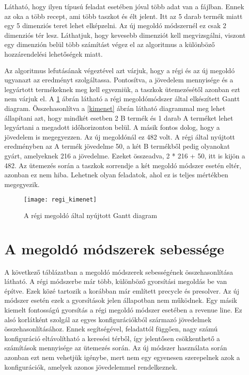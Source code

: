 Látható, hogy ilyen típusú feladat esetében jóval több adat van a fájlban.
Ennek az oka a több recept, ami több taszkot és élt jelent.
Itt az 5 darab termék miatt egy 5 dimenziós teret lehet elképzelni.
Az új megoldó módszernél ez csak 2 dimenziós tér lesz.
Láthatjuk, hogy kevesebb dimenziót kell megvizsgálni, viszont egy dimenzión belül több számítást végez el az algoritmus a különböző hozzárendelési lehetőségek miatt. 

Az algoritmus lefutásának végeztével azt várjuk, hogy a régi és az új megoldó ugyanazt az eredményt szolgáltassa.
Pontosítva, a jövedelem mennyisége és a legyártott termékeknek meg kell egyezniük, a taszkok ütemezésétől azonban ezt nem várjuk el.
A \ref{regi_kimenet} ábrán látható a régi megoldómódszer által elkészített Gantt diagram.
Összehasonlítva a \ref{kimenet} ábrán látható diagrammal meg lehet állapítani azt, hogy mindkét esetben 2 B termék és 1 darab A terméket lehet legyártani a megadott időhorizonton belül.
A másik fontos dolog, hogy a jövedelem is megegyezzen.
Az új megoldónál ez 482 volt.
A régi által nyújtott eredményben az A termék jövedelme 50, a két B termékből pedig olyanokat gyárt, amelyeknek 216 a jövedelme.
Ezeket összeadva, 2 * 216 + 50, itt is kijön a 482.
Az ütemezés során a taszkok sorrendje a két megoldó módszer esetén eltér, azonban ez nem hiba.
Lehetnek olyan feladatok, ahol ez is teljes mértékben megegyezik.

\begin{figure}[H]
\begin{center}
\texttt{[image: regi\_kimenet]}
\caption{A régi megoldó által nyújtott Gantt diagram}
\label{regi_kimenet}
\end{center}
\end{figure}

\section{A megoldó módszerek sebessége}
A következő táblázatban a megoldó módszerek sebességének összehasonlítása látható.
A régi módszerbe már több, különböző gyorsítási megoldás be van építve.
Ezek közé tartozik a korábban már említett precycle és presolver.
Az új módszer esetén ezek a gyorsítások jelen állapotban nem működnek.
Egy másik kiemelt fontosságú gyorsítás a régi megoldó módszer esetében a revenue line.
Ez alsó korlátként szolgál az egyes konfigurációkból származó jövedelmek összehasonlításához.
Ennek segítségével, feladattól függően, nagy számú konfiguráció eltávolítható a keresési térből, így jelentősen csökkenthető a számítások mennyisége az ütemezés során.
Az új módszer használata során azonban ezt nem vehetjük igénybe, mert nem egy egyenesen szerepelnek azok a konfigurációk, amelyek azonos jövedelemmel rendelkeznek. 

